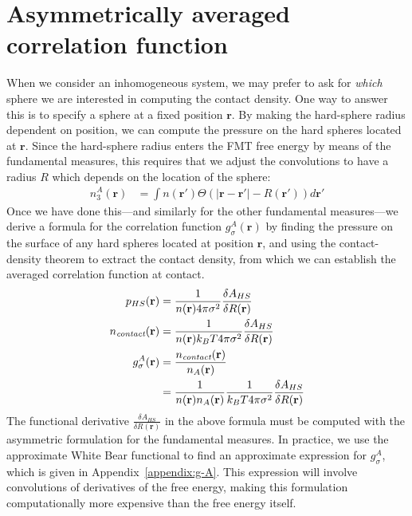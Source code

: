 \documentclass[letterpaper,twocolumn,amsmath,amssymb,jcp,10pt,aip]{revtex4-1}
\newcommand{\rr}{\textbf{r}}
\newcommand{\derivation}[1]{} %
\begin{document}
\section{Asymmetrically averaged correlation function}\label{sec:g-A}

When we consider an inhomogeneous system, we may prefer to ask for
\emph{which} sphere we are interested in computing the contact
density.  One way to answer this is to specify a sphere at a fixed
position $\mathbf{r}$.  By making the hard-sphere radius dependent on
position, we can compute the pressure on the hard spheres located at
$\mathbf{r}$.  Since the hard-sphere radius enters the FMT free energy
by means of the fundamental measures, this requires that we adjust the
convolutions to have a radius $R$ which depends on the location of the
sphere:
\begin{align}
  n_3^A(\rr) &= \int n(\rr')\Theta(|\rr-\rr'|-R(\rr'))d\rr' \label{eq:n3A}
\end{align}
Once we have done this---and similarly for the other fundamental
measures---we derive a formula for the correlation function
$g_\sigma^A(\rr)$ by finding the pressure on the surface of any hard
spheres located at position $\rr$, and using the contact-density
theorem to extract the contact density, from which we can establish
the averaged correlation function at contact.
\begin{align}
  p_{HS}(\mathbf{r}) &= \frac{1}{n(\rr) 4\pi \sigma^2} \frac{\delta
    A_{HS}}{\delta R(\mathbf{r})} \label{eq:p_{HS}^A}\\
  \ncontact(\rr) &= \frac{1}{n(\rr) k_BT 4\pi \sigma^2} \frac{\delta
    A_{HS}}{\delta R(\mathbf{r})} \\
  g_\sigma^A(\rr) &= \frac{\ncontact(\rr)}{n_A(\rr)} \\
  &= \frac{1}{n(\rr) n_A(\rr)}\frac{1}{ k_BT 4\pi \sigma^2} \frac{\delta
    A_{HS}}{\delta R(\mathbf{r})} \label{eq:g-A-exact}
\end{align}
The functional derivative $\frac{\delta A_{HS}}{\delta R(\mathbf{r})}$
in the above formula must be computed with the asymmetric formulation
for the fundamental measures.  In practice, we use the approximate
White Bear functional to find an approximate expression for
$g_\sigma^A$, which is given in Appendix~\ref{appendix:g-A}.  This
expression will involve convolutions of derivatives of the free
energy, making this formulation computationally more expensive than
the free energy itself.


\derivation{
  \end{widetext}
}
\end{document}
